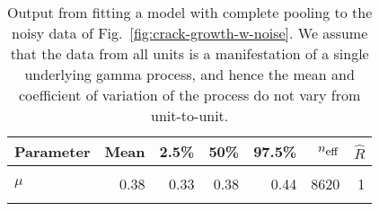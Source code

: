\begin{table}
\centering
\caption{\label{tab:cp}Output from fitting a model with complete pooling to the noisy data of Fig.~\ref{fig:crack-growth-w-noise}. We assume that the data from all units is a manifestation of a single underlying gamma process, and hence the mean and coefficient of variation of the process do not vary from unit-to-unit.}
\centering
\begin{tabular}[t]{lrrrrrr}
\toprule
Parameter & Mean & 2.5\% & 50\% & 97.5\% & $n_{\small{\mbox{eff}}}$ & $\hat{R}$\\
\midrule
\cellcolor{gray!10}{$\sigma$} & \cellcolor{gray!10}{0.03} & \cellcolor{gray!10}{0.02} & \cellcolor{gray!10}{0.03} & \cellcolor{gray!10}{0.04} & \cellcolor{gray!10}{2591} & \cellcolor{gray!10}{1}\\
$\mu$ & 0.38 & 0.33 & 0.38 & 0.44 & 8620 & 1\\
\cellcolor{gray!10}{$\nu$} & \cellcolor{gray!10}{0.21} & \cellcolor{gray!10}{0.15} & \cellcolor{gray!10}{0.21} & \cellcolor{gray!10}{0.28} & \cellcolor{gray!10}{926} & \cellcolor{gray!10}{1}\\
\bottomrule
\end{tabular}
\end{table}
